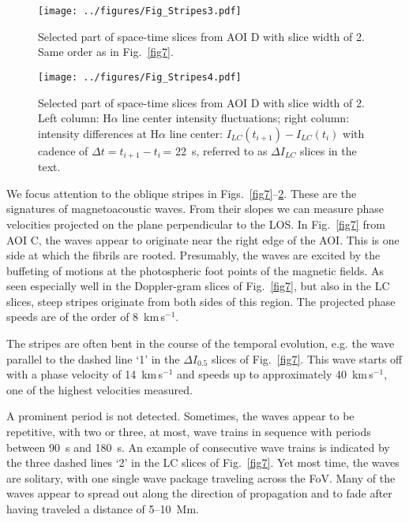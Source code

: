 \begin{figure}
\center 
\texttt{[image: ../figures/Fig\_Stripes3.pdf]} 
\caption{Selected part of space-time slices from AOI D with slice width of 2. Same order as in Fig.~\ref{fig7}.}  
\label{fig9}
\end{figure}


\begin{figure}
\center 
\texttt{[image: ../figures/Fig\_Stripes4.pdf]} 
\caption{Selected part of space-time slices from AOI D with slice width of 2. Left column: H$\alpha$ line center intensity fluctuations; right column: intensity differences at H$\alpha$ line center: $I_{LC}(t_{i+1})-I_{LC}(t_{i})$ with cadence of $\Delta t=t_{i+1}-t_{i}$\,= 22~s, referred to as $\Delta I_{LC}$ slices in the text.}  
\label{fig10}
\end{figure}

We focus attention to the oblique stripes in Figs.~\ref{fig7}--\ref{fig10}. These are the signatures of magnetoacoustic waves. From their slopes we can measure phase velocities projected on the plane {perpendicular} to the LOS. In Fig.~\ref{fig7} from AOI C, the waves appear to originate near the right edge of the AOI. This is one side at which the fibrils are rooted. Presumably, the waves are excited by the {buffeting} of motions at the photospheric foot points of the magnetic fields. As seen especially well in the Doppler-gram slices of Fig.~\ref{fig7}, but also in the LC slices, steep stripes originate from both sides of this region. The projected phase speeds are of the order of 8~km\,s$^{-1}$.

The stripes are often bent in the course of the temporal evolution, e.g. the wave parallel to the dashed line `1' in the $\Delta I_{0.5}$ slices of Fig.~\ref{fig7}. This wave starts off with a phase velocity of 14~km\,s$^{-1}$ and speeds up to approximately 40~km\,s$^{-1}$, one of the highest velocities measured.




A prominent period is not detected. Sometimes, the waves appear to be {repetitive}, with two or three, at most, wave trains in sequence with periods between 90~s and 180~s. An example of consecutive wave trains is indicated by the three dashed lines `2' in the LC slices of Fig.~\ref{fig7}. Yet most time, the waves are solitary, with one single wave package traveling across the FoV. Many of the waves appear to spread out along the direction of propagation and to fade after having traveled a distance of 5--10~Mm.


